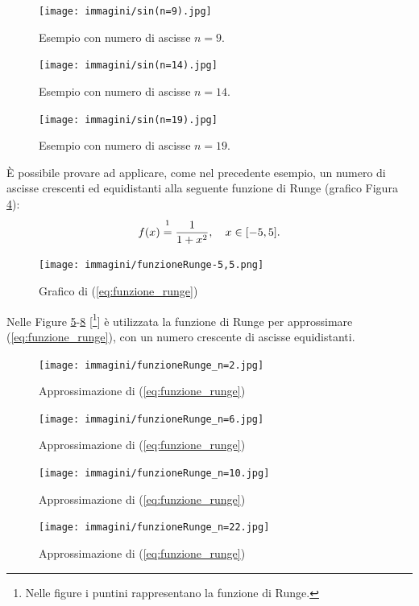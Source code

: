 \begin{figure}%
\centering
\texttt{[image: immagini/sin(n=9).jpg]}
\caption{Esempio con numero di ascisse $n=9$.}\label{fig:approxErrIntepolaz9}
\end{figure}

\begin{figure}%
\centering
\texttt{[image: immagini/sin(n=14).jpg]}
\caption{Esempio con numero di ascisse $n=14$.}\label{fig:approxErrIntepolaz14}
\end{figure}

\begin{figure}%
\centering
\texttt{[image: immagini/sin(n=19).jpg]}
\caption{Esempio con numero di ascisse $n=19$.}\label{fig:approssimazione_errore_intepolazione19}
\end{figure}

È possibile provare ad applicare, come nel precedente esempio, un numero di ascisse crescenti ed equidistanti alla seguente funzione di Runge (grafico Figura \ref{fig:funzione_runge-5,5}):
\begin{equation}\label{eq:funzione_runge}
    f(x)\overset{\footnotemark}{=}\frac{1}{1+x^2},\quad x\in [-5,5].
\end{equation}


\begin{figure}
    \centering
    \texttt{[image: immagini/funzioneRunge-5,5.png]}
    \caption{Grafico di (\ref{eq:funzione_runge})}\label{fig:funzione_runge-5,5}
\end{figure}

Nelle Figure \ref{fig:funzione_runge_n=2}-\ref{fig:funzione_runge_n=22} [\footnote{Nelle figure i puntini rappresentano la funzione di Runge.}] è utilizzata la funzione di Runge per approssimare (\ref{eq:funzione_runge}), con un numero crescente di ascisse equidistanti.

\begin{figure}
    \centering
    \texttt{[image: immagini/funzioneRunge\_n=2.jpg]}
    \caption{Approssimazione di (\ref{eq:funzione_runge})}\label{fig:funzione_runge_n=2}
\end{figure}
\begin{figure}
    \centering
    \texttt{[image: immagini/funzioneRunge\_n=6.jpg]}
    \caption{Approssimazione di (\ref{eq:funzione_runge})}\label{fig:funzione_runge_n=6}
\end{figure}
\begin{figure}
    \centering
    \texttt{[image: immagini/funzioneRunge\_n=10.jpg]}
    \caption{Approssimazione di (\ref{eq:funzione_runge})}\label{fig:funzione_runge_n=10}
\end{figure}
\begin{figure}
    \centering
    \texttt{[image: immagini/funzioneRunge\_n=22.jpg]}
    \caption{Approssimazione di (\ref{eq:funzione_runge})}\label{fig:funzione_runge_n=22}
\end{figure}


